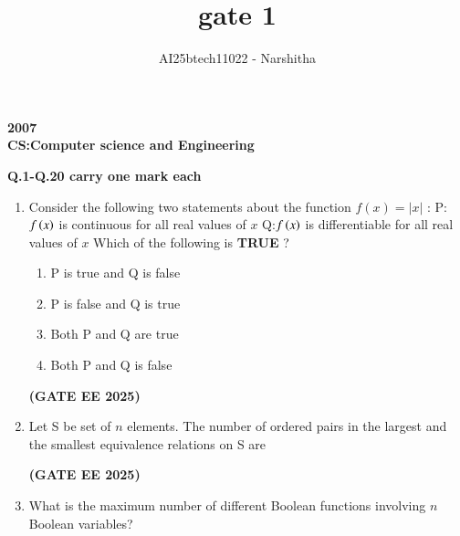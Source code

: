 \documentclass[journal,12pt,onecolumn]{IEEEtran}
\theoremstyle{remark}
\begin{document}
\title{gate 1}
\author{AI25btech11022 - Narshitha}
\maketitle
\renewcommand{\thefigure}{\theenumi}
\renewcommand{\thetable}{\theenumi}
\begin {center}
\large \textbf{2007}\\
\large \textbf{CS:Computer science and Engineering}\\


\begin{center}
\textbf{Q.1-Q.20 carry one mark each}
\end{center}

\begin{enumerate}
\item    Consider the following two statements about the function $f(x)=|x|$ :
\newline
P: $f\left(x\right)$ is continuous for all real values of $x$
\newline
 Q:$f\left(x\right)$ is differentiable for all real values of $x$
 \newline
 Which of the following is \textbf{TRUE} ?

\begin{enumerate}
 

    \item  P is true and Q is false
    \item  P is false and Q is true
    \item Both P  and Q are true
    \item Both P and Q is false

\end{enumerate}
\hfill \textbf{(GATE EE 2025)}
\item    Let S be set of $n$ elements. The number of ordered pairs in the largest and the smallest equivalence relations on S are

\begin{enumerate}[label=(\Alph*)]
\end{enumerate}
\hfill \textbf{(GATE EE 2025)}
    \item    What is the maximum number of different Boolean functions involving $n$ Boolean variables?
  

\end{enumerate}
\end{center}
\end{document}
